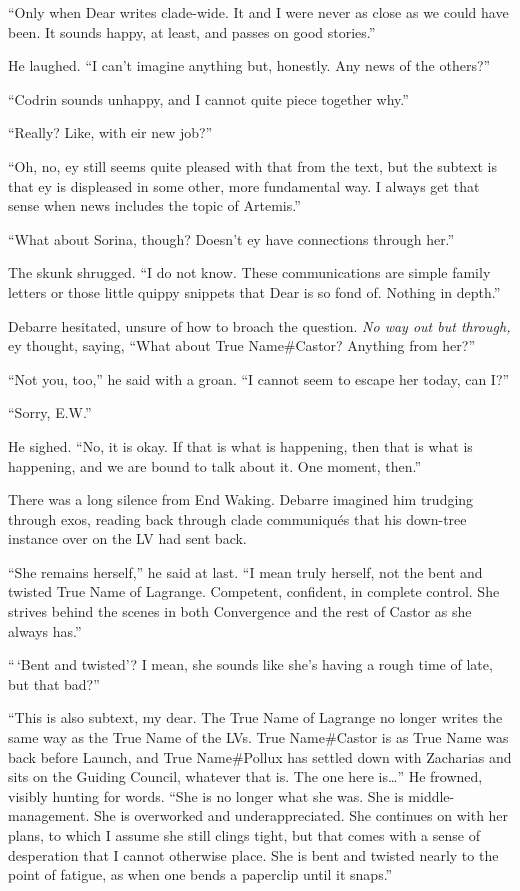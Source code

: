 ``Only when Dear writes clade-wide. It and I were never as close as we could have been. It sounds happy, at least, and passes on good stories.''

He laughed. ``I can't imagine anything but, honestly. Any news of the others?''

``Codrin sounds unhappy, and I cannot quite piece together why.''

``Really? Like, with eir new job?''

``Oh, no, ey still seems quite pleased with that from the text, but the subtext is that ey is displeased in some other, more fundamental way. I always get that sense when news includes the topic of Artemis.''

``What about Sorina, though? Doesn't ey have connections through her.''

The skunk shrugged. ``I do not know. These communications are simple family letters or those little quippy snippets that Dear is so fond of. Nothing in depth.''

Debarre hesitated, unsure of how to broach the question. \emph{No way out but through,} ey thought, saying, ``What about True Name\#Castor? Anything from her?''

``Not you, too,'' he said with a groan. ``I cannot seem to escape her today, can I?''

``Sorry, E.W.''

He sighed. ``No, it is okay. If that is what is happening, then that is what is happening, and we are bound to talk about it. One moment, then.''

There was a long silence from End Waking. Debarre imagined him trudging through exos, reading back through clade communiqués that his down-tree instance over on the LV had sent back.

``She remains herself,'' he said at last. ``I mean truly herself, not the bent and twisted True Name of Lagrange. Competent, confident, in complete control. She strives behind the scenes in both Convergence and the rest of Castor as she always has.''

``\,`Bent and twisted'? I mean, she sounds like she's having a rough time of late, but that bad?''

``This is also subtext, my dear. The True Name of Lagrange no longer writes the same way as the True Name of the LVs. True Name\#Castor is as True Name was back before Launch, and True Name\#Pollux has settled down with Zacharias and sits on the Guiding Council, whatever that is. The one here is\ldots{}'' He frowned, visibly hunting for words. ``She is no longer what she was. She is middle-management. She is overworked and underappreciated. She continues on with her plans, to which I assume she still clings tight, but that comes with a sense of desperation that I cannot otherwise place. She is bent and twisted nearly to the point of fatigue, as when one bends a paperclip until it snaps.''

